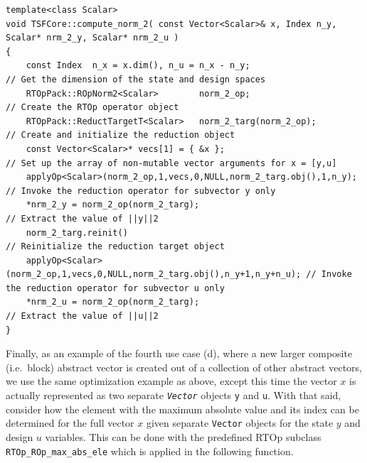 \documentclass[10pt,fleqn]{article}
\begin{document}
{\scriptsize\begin{verbatim}
template<class Scalar>
void TSFCore::compute_norm_2( const Vector<Scalar>& x, Index n_y, Scalar* nrm_2_y, Scalar* nrm_2_u )
{
    const Index  n_x = x.dim(), n_u = n_x - n_y;                              // Get the dimension of the state and design spaces
    RTOpPack::ROpNorm2<Scalar>        norm_2_op;                              // Create the RTOp operator object
    RTOpPack::ReductTargetT<Scalar>   norm_2_targ(norm_2_op);                 // Create and initialize the reduction object
    const Vector<Scalar>* vecs[1] = { &x };                                   // Set up the array of non-mutable vector arguments for x = [y,u]
    applyOp<Scalar>(norm_2_op,1,vecs,0,NULL,norm_2_targ.obj(),1,n_y);         // Invoke the reduction operator for subvector y only
    *nrm_2_y = norm_2_op(norm_2_targ);                                        // Extract the value of ||y||2
    norm_2_targ.reinit()                                                      // Reinitialize the reduction target object
    applyOp<Scalar>(norm_2_op,1,vecs,0,NULL,norm_2_targ.obj(),n_y+1,n_y+n_u); // Invoke the reduction operator for subvector u only
    *nrm_2_u = norm_2_op(norm_2_targ);                                        // Extract the value of ||u||2
}
\end{verbatim}}

Finally, as an example of the fourth use case (d), where a new larger
composite (i.e.~block) abstract vector is created out of a collection
of other abstract vectors, we use the same optimization example as
above, except this time the vector $x$ is actually represented as two
separate \texttt{\textit{Vector}} objects \texttt{y} and \texttt{u}.
With that said, consider how the element with the maximum absolute
value and its index can be determined for the full vector $x$ given
separate \texttt{Vector} objects for the state $y$ and design $u$
variables.  This can be done with the predefined RTOp subclass
\texttt{RTOp\_ROp\_max\_abs\_ele} which is applied in the following
function.
\end{document}
